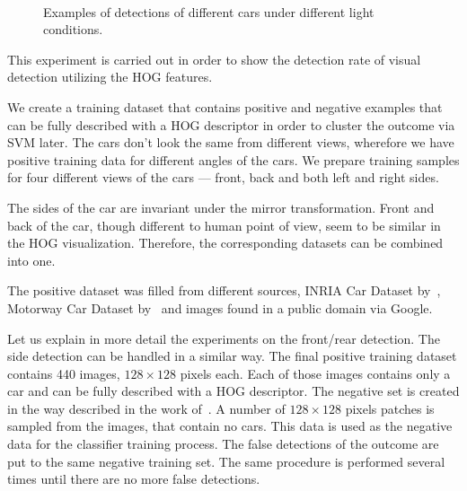 \begin{figure}[p]
\\
\caption{Examples of detections of different cars under different light conditions.}
\label{fig:detection_examples}
\end{figure}

This experiment is carried out in order to show the detection rate of visual
detection utilizing the HOG features.

We create a training dataset that contains positive and negative examples that
can be fully described with a HOG descriptor in order to cluster the outcome
via SVM later. The cars don't look the same from different views, wherefore we
have positive training data for different angles of the cars. We prepare
training samples for four different views of the cars --- front, back and both
left and right sides.

The sides of the car are invariant under the mirror transformation. Front and
back of the car, though different to human point of view, seem to be similar
in the HOG visualization. Therefore, the corresponding datasets can be
combined into one.

The positive dataset was filled from different sources, INRIA Car Dataset
by~\cite{inriadata}, Motorway Car Dataset by~\cite{TMEMotorwayDataset} and
images found in a public domain via Google.

Let us explain in more detail the experiments on the front/rear detection. The
side detection can be handled in a similar way. The final positive training
dataset contains 440 images, $128 \times 128$ pixels each. Each of those
images contains only a car and can be fully described with a HOG descriptor.
The negative set is created in the way described in the work
of~\cite{dalal2005}. A number of $128 \times 128$ pixels patches is sampled
from the images, that contain no cars. This data is used as the negative data
for the classifier training process. The false detections of the outcome are
put to the same negative training set. The same procedure is performed several
times until there are no more false detections.

